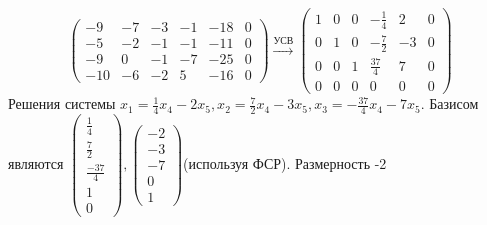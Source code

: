 	\section{}
	$$\begin{pmatrix}
		-9 & -7 & -3 & -1 & -18 & 0 \\
		-5 & -2 & -1 & -1 & -11 & 0 \\
		-9 & 0 & -1 & -7 & -25 & 0 \\
		-10	&-6&	-2&	 5&	-16&	0
	\end{pmatrix}\xrightarrow{\text{УСВ}}
	\begin{pmatrix}
	1 &  0 & 0 & -\frac14 & 2 & 0 \\
	0 & 1 & 0 & -\frac72 & -3 & 0 \\
	0 & 0 & 1 & \frac{37}{4} & 7 & 0\\
	0 & 0 & 0 & 0 & 0 & 0
	\end{pmatrix}$$
	Решения системы $x_1 = \frac14x_4 - 2x_5, x_2 = \frac72x_4-3x_5,x_3 = -\frac{37}{4}x_4-7x_5$. Базисом являются $\begin{pmatrix}
		\frac14 \\ \frac72 \\ \frac{-37}{4} \\1 \\0 
	\end{pmatrix}, \begin{pmatrix}
	-2 \\ -3 \\-7 \\ 0 \\1
	\end{pmatrix}$(используя ФСР). Размерность -2 
